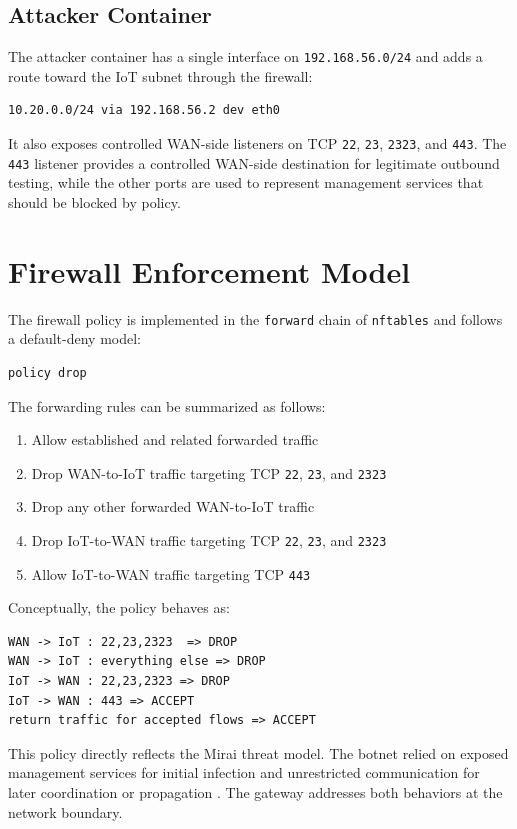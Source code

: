\documentclass[journal]{IEEEtran}
\begin{document}
\subsection{Attacker Container}
The attacker container has a single interface on \texttt{192.168.56.0/24} and adds a route toward the IoT subnet through the firewall:

\begin{lstlisting}
10.20.0.0/24 via 192.168.56.2 dev eth0
\end{lstlisting}

It also exposes controlled WAN-side listeners on TCP \texttt{22}, \texttt{23}, \texttt{2323}, and \texttt{443}. The \texttt{443} listener provides a controlled WAN-side destination for legitimate outbound testing, while the other ports are used to represent management services that should be blocked by policy.

\section{Firewall Enforcement Model}
The firewall policy is implemented in the \texttt{forward} chain of \texttt{nftables} and follows a default-deny model:

\begin{lstlisting}
policy drop
\end{lstlisting}

The forwarding rules can be summarized as follows:
\begin{enumerate}
\item Allow established and related forwarded traffic
\item Drop WAN-to-IoT traffic targeting TCP \texttt{22}, \texttt{23}, and \texttt{2323}
\item Drop any other forwarded WAN-to-IoT traffic
\item Drop IoT-to-WAN traffic targeting TCP \texttt{22}, \texttt{23}, and \texttt{2323}
\item Allow IoT-to-WAN traffic targeting TCP \texttt{443}
\end{enumerate}

Conceptually, the policy behaves as:

\begin{lstlisting}
WAN -> IoT : 22,23,2323  => DROP
WAN -> IoT : everything else => DROP
IoT -> WAN : 22,23,2323 => DROP
IoT -> WAN : 443 => ACCEPT
return traffic for accepted flows => ACCEPT
\end{lstlisting}

This policy directly reflects the Mirai threat model. The botnet relied on exposed management services for initial infection and unrestricted communication for later coordination or propagation \cite{mirai_usenix}. The gateway addresses both behaviors at the network boundary.
\end{document}
